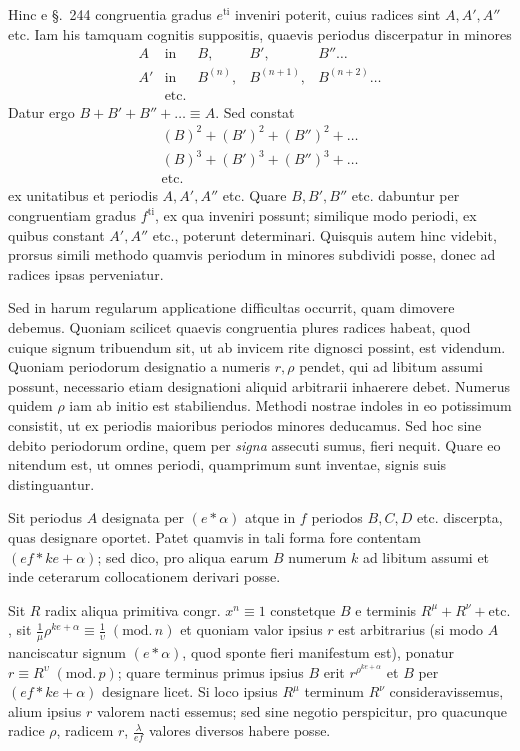 Hinc e §.\ 244 congruentia gradus $e^{\mathrm{ti}}$ inveniri poterit, cuius radices sint $A,A',A''$ etc. Iam his tamquam cognitis suppositis, quaevis periodus discerpatur in minores
\[
\begin{array}{rclll}
A&\text{in}&B,&B',&B''\ldots\\
A'&\text{in}&B^{(n)},&B^{(n+1)},&B^{(n+2)}\ldots\\
&\text{etc.}
\end{array}
\]
Datur ergo $B+B'+B''+\ldots\equiv A$. Sed constat
\[
\begin{gathered}
(B)^2+(B')^2+(B'')^2+\ldots\\
(B)^3+(B')^3+(B'')^3+\ldots\\
\text{etc.}
\end{gathered}
\]
ex unitatibus et periodis $A,A',A''$ etc. Quare $B,B',B''$ etc. dabuntur per congruentiam gradus $f^{\mathrm{ti}}$, ex qua inveniri possunt; similique modo periodi, ex quibus constant $A',A''$ etc., poterunt determinari. Quisquis autem hinc videbit, prorsus simili methodo quamvis periodum in minores subdividi posse, donec ad radices ipsas perveniatur.

Sed in harum regularum applicatione difficultas occurrit, quam dimovere debemus. Quoniam scilicet quaevis congruentia plures radices habeat, quod cuique signum tribuendum sit, ut ab invicem rite dignosci possint, est videndum. Quoniam periodorum designatio a numeris $r,\rho$ pendet, qui ad libitum assumi possunt, necessario etiam designationi aliquid arbitrarii inhaerere debet. Numerus quidem $\rho$ iam ab initio est stabiliendus. Methodi nostrae indoles in eo potissimum consistit, ut ex periodis maioribus periodos minores deducamus. Sed hoc sine debito periodorum ordine, quem per \emph{signa} assecuti sumus, fieri nequit. Quare eo nitendum est, ut omnes periodi, quamprimum sunt inventae, signis suis distinguantur.

Sit periodus $A$ designata per $(e\ast\alpha)$ atque in $f$ periodos $B,C,D$ etc. discerpta, quas designare oportet. Patet quamvis in tali forma fore contentam $(ef\ast ke+\alpha)$; sed dico, pro aliqua earum $B$ numerum $k$ ad libitum assumi et inde ceterarum collocationem derivari posse.

Sit $R$ radix aliqua primitiva congr. $x^n\equiv1$ constetque $B$ e terminis $R^\mu+R^\nu+\text{etc.}$, sit $\frac1\mu\rho^{ke+\alpha}\equiv\frac1\upsilon\;(\mathrm{mod.}\,n)$ et quoniam valor ipsius $r$ est arbitrarius (si modo $A$ nanciscatur signum $(e\ast\alpha)$, quod sponte fieri manifestum est), ponatur $r\equiv R^\upsilon\;(\mathrm{mod.}\,p)$; quare terminus primus ipsius $B$ erit $r^{\rho^{ke+\alpha}}$ et $B$ per
$(ef\ast ke+\alpha)$ designare licet. Si loco ipsius $R^\mu$ terminum $R^\nu$ consideravissemus, alium ipsius $r$ valorem nacti essemus; sed sine negotio perspicitur, pro quacunque radice $\rho$, radicem $r$, $\frac\lambda{ef}$ valores diversos habere posse.

